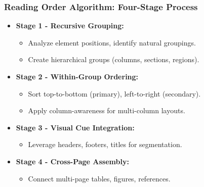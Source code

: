 \begin{frame}[fragile]\frametitle{Reading Order Algorithm: Four-Stage Process}
      \begin{itemize}
        \item \textbf{Stage 1 - Recursive Grouping:}
        \begin{itemize}
          \item Analyze element positions, identify natural groupings.
          \item Create hierarchical groups (columns, sections, regions).
        \end{itemize}
        \item \textbf{Stage 2 - Within-Group Ordering:}
        \begin{itemize}
          \item Sort top-to-bottom (primary), left-to-right (secondary).
          \item Apply column-awareness for multi-column layouts.
        \end{itemize}
        \item \textbf{Stage 3 - Visual Cue Integration:}
        \begin{itemize}
          \item Leverage headers, footers, titles for segmentation.
        \end{itemize}
        \item \textbf{Stage 4 - Cross-Page Assembly:}
        \begin{itemize}
          \item Connect multi-page tables, figures, references.
        \end{itemize}
      \end{itemize}
\end{frame}

